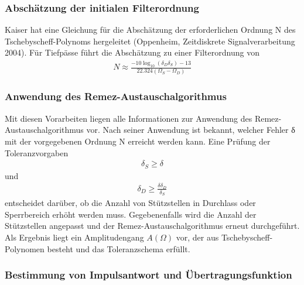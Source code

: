 \subsubsection{Abschätzung der initialen Filterordnung}\label{sec:abschuxe4tzung-der-initialen-filterordnung}

Kaiser hat eine Gleichung für die Abschätzung der erforderlichen Ordnung N des Tschebyscheff-Polynoms hergeleitet (Oppenheim, Zeitdiskrete Signalverarbeitung 2004). Für Tiefpässe führt die Abschätzung zu einer Filterordnung von
\begin{align}
N \approx \frac{- 10  \log_{10}\left( \delta_{D}  \delta_{S} \right) - 13}{2  2.324  \left( \Omega_{S} - \Omega_{D} \right)} \label{eq:9.150}
\end{align}
\subsubsection{Anwendung des Remez-Austauschalgorithmus}\label{sec:anwendung-des-remez-austauschalgorithmus}

Mit diesen Vorarbeiten liegen alle Informationen zur Anwendung des Remez-Austauschalgorithmus vor. Nach seiner Anwendung ist bekannt, welcher Fehler δ mit der vorgegebenen Ordnung N erreicht werden kann. Eine Prüfung der Toleranzvorgaben
\begin{align}
\delta_{S} \geq \delta \label{eq:9.151}
\end{align}
und
\begin{align}
\delta_{D} \geq \frac{\delta  \delta_{D}}{\delta_{S}} \label{eq:9.152}
\end{align}
entscheidet darüber, ob die Anzahl von Stützstellen in Durchlass oder Sperrbereich erhöht werden muss. Gegebenenfalls wird die Anzahl der Stützstellen angepasst und der Remez-Austauschalgorithmus erneut durchgeführt. Als Ergebnis liegt ein Amplitudengang \(A(Ω)\) vor, der aus Tschebyscheff-Polynomen besteht und das Toleranzschema erfüllt.

\subsubsection{Bestimmung von Impulsantwort und Übertragungsfunktion}\label{sec:bestimmung-von-impulsantwort-und-uxfcbertragungsfunktion}

